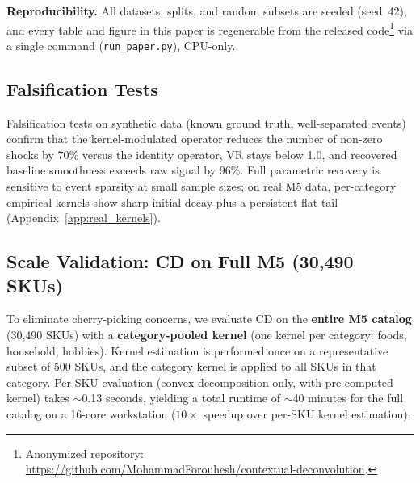 \documentclass[10pt]{article} %
\theoremstyle{plain}
\theoremstyle{definition}
\begin{document}
\textbf{Reproducibility.} All datasets, splits, and random subsets are seeded (seed~42), and every table and figure in this paper is regenerable from the released code\footnote{Anonymized repository: \url{https://github.com/MohammadForouhesh/contextual-deconvolution}.} via a single command (\texttt{run\_paper.py}), CPU-only.

\subsection{Falsification Tests}

Falsification tests on synthetic data (known ground truth, well-separated events) confirm that the kernel-modulated operator reduces the number of non-zero shocks by 70\% versus the identity operator, VR stays below 1.0, and recovered baseline smoothness exceeds raw signal by 96\%. Full parametric recovery is sensitive to event sparsity at small sample sizes; on real M5 data, per-category empirical kernels show sharp initial decay plus a persistent flat tail (Appendix~\ref{app:real_kernels}).

\subsection{Scale Validation: CD on Full M5 (30,490 SKUs)}

\label{sec:large_scale}

To eliminate cherry-picking concerns, we evaluate CD on the \textbf{entire M5 catalog} (30,490 SKUs) with a \textbf{category-pooled kernel} (one kernel per category: foods, household, hobbies). Kernel estimation is performed once on a representative subset of 500 SKUs, and the category kernel is applied to all SKUs in that category. Per-SKU evaluation (convex decomposition only, with pre-computed kernel) takes $\sim$0.13 seconds, yielding a total runtime of $\sim$40 minutes for the full catalog on a 16-core workstation ($10\times$ speedup over per-SKU kernel estimation).

\begin{table}[t]
\centering
\footnotesize
\setlength{\tabcolsep}{4pt}
\caption{CD Scale Validation on M5}
\label{tab:scale_validation}
\end{table}
\end{document}
